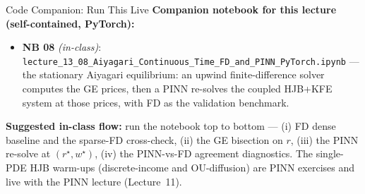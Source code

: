 \documentclass[aspectratio=169,11pt]{beamer}
\begin{document}
\begin{frame}{Code Companion: Run This Live}
\footnotesize
\textbf{Companion notebook for this lecture (self-contained, PyTorch):}
\begin{itemize}\itemsep2pt
    \item \textbf{NB 08} \textit{(in-class)}: \texttt{lecture\_13\_08\_Aiyagari\_Continuous\_Time\_FD\_and\_PINN\_PyTorch.ipynb} --- the stationary Aiyagari equilibrium: an upwind finite-difference solver computes the GE prices, then a PINN re-solves the coupled HJB+KFE system at those prices, with FD as the validation benchmark.
\end{itemize}

\vspace{0.2em}
\textbf{Suggested in-class flow:} run the notebook top to bottom --- (i) FD dense baseline and the sparse-FD cross-check, (ii) the GE bisection on $r$, (iii) the PINN re-solve at $(r^\star, w^\star)$, (iv) the PINN-vs-FD agreement diagnostics. The single-PDE HJB warm-ups (discrete-income and OU-diffusion) are PINN exercises and live with the PINN lecture (Lecture~11).
\end{frame}
\end{document}

